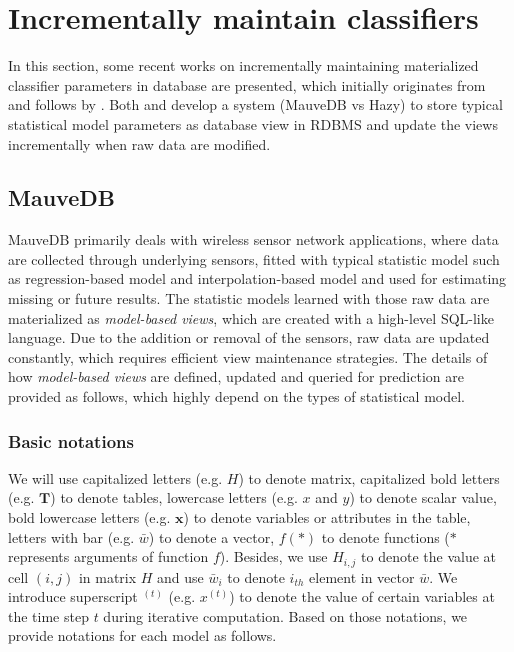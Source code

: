 \section{Incrementally maintain classifiers}
In this section, some recent works on incrementally maintaining materialized classifier parameters in database are presented, which initially originates from \cite{deshpande2006mauvedb} and follows by \cite{koc2011incrementally}. Both \cite{deshpande2006mauvedb} and \cite{koc2011incrementally} develop a system (MauveDB vs Hazy) to store typical statistical model parameters as database view in RDBMS and update the views incrementally when raw data are modified.   

\subsection{MauveDB}
MauveDB primarily deals with wireless sensor network applications, where data are collected through underlying sensors, fitted with typical statistic model such as regression-based model and interpolation-based model and used for estimating missing or future results. The statistic models learned with those raw data are materialized as {\em model-based views}, which are created with a high-level SQL-like language. Due to the addition or removal of the sensors, raw data are updated constantly, which requires efficient view maintenance strategies. The details of how {\em model-based views} are defined, updated and queried for prediction are provided as follows, which highly depend on the types of statistical model.

\subsubsection{Basic notations}
We will use capitalized letters (e.g. $H$) to denote matrix, capitalized bold letters (e.g. $\textbf{T}$) to denote tables, lowercase letters (e.g. $x$ and $y$) to denote scalar value, bold lowercase letters (e.g. $\textbf{x}$) to denote variables or attributes in the table, letters with bar (e.g. $\bar{w}$) to denote a vector, $f(*)$ to denote functions ($*$ represents arguments of function $f$). Besides, we use $H_{i,j}$ to denote the value at cell $(i,j)$ in matrix $H$ and use $\bar{w}_i$ to denote $i_{th}$ element in vector $\bar{w}$. We introduce superscript $^{(t)}$ (e.g. $x^{(t)}$) to denote the value of certain variables at the time step $t$ during iterative computation. Based on those notations, we provide notations for each model as follows.


